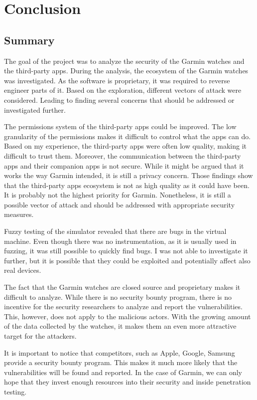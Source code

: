 \chapter{Conclusion}
\section{Summary}

The goal of the project was to analyze the security of the Garmin watches and the third-party apps.
During the analysis, the ecosystem of the Garmin watches was investigated.
As the software is proprietary, it was required to reverse engineer parts of it.
Based on the exploration, different vectors of attack were considered.
Leading to finding several concerns that should be addressed or investigated further.

The permissions system of the third-party apps could be improved.
The low granularity of the permissions makes it difficult to control what the apps can do.
Based on my experience, the third-party apps were often low quality, making it difficult to trust them.
Moreover, the communication between the third-party apps and their companion apps is not secure.
While it might be argued that it works the way Garmin intended, it is still a privacy concern.
Those findings show that the third-party apps ecosystem is not as high quality as it could have been.
It is probably not the highest priority for Garmin.
Nonetheless, it is still a possible vector of attack and should be addressed with appropriate security measures.

Fuzzy testing of the simulator revealed that there are bugs in the virtual machine.
Even though there was no instrumentation, as it is usually used in fuzzing, it was still possible to quickly find bugs.
I was not able to investigate it further, but it is possible that they could be exploited and potentially affect also real devices.

The fact that the Garmin watches are closed source and proprietary makes it difficult to analyze.
While there is no security bounty program, there is no incentive for the security researchers to analyze and report the vulnerabilities.
This, however, does not apply to the malicious actors.
With the growing amount of the data collected by the watches, it makes them an even more attractive target for the attackers.

It is important to notice that competitors, such as Apple, Google, Samsung provide a security bounty program.
This makes it much more likely that the vulnerabilities will be found and reported.
In the case of Garmin, we can only hope that they invest enough resources into their security and inside penetration testing.


